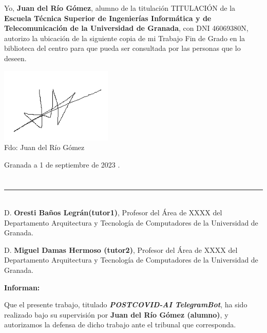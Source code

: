 Yo, \textbf{Juan del Río Gómez}, alumno de la titulación TITULACIÓN de la \textbf{Escuela Técnica Superior
de Ingenierías Informática y de Telecomunicación de la Universidad de Granada}, con DNI 46069380N, autorizo la ubicación de la siguiente copia de mi Trabajo Fin de Grado en la biblioteca del centro para que pueda ser consultada por las personas que lo deseen.

\vspace{5cm}

\includegraphics[width=0.4\textwidth]{imagenes/firma.png}\\[0.5cm]

\noindent Fdo: Juan del Río Gómez


\vspace{2cm}

\begin{flushright}
Granada a 1 de septiembre de 2023 .
\end{flushright}


\chapter*{}
\thispagestyle{empty}

\noindent\rule[-1ex]{\textwidth}{2pt}\\[4.5ex]

D. \textbf{Oresti Baños Legrán(tutor1)}, Profesor del Área de XXXX del Departamento Arquitectura y Tecnología de Computadores de la Universidad de Granada.

\vspace{0.5cm}

D. \textbf{Miguel Damas Hermoso (tutor2)}, Profesor del Área de XXXX del Departamento Arquitectura y Tecnología de Computadores de la Universidad de Granada.


\vspace{0.5cm}

\textbf{Informan:}

\vspace{0.5cm}

Que el presente trabajo, titulado \textit{\textbf{POSTCOVID-AI TelegramBot}},
ha sido realizado bajo su supervisión por \textbf{Juan del Río Gómez (alumno)}, y autorizamos la defensa de dicho trabajo ante el tribunal
que corresponda.

